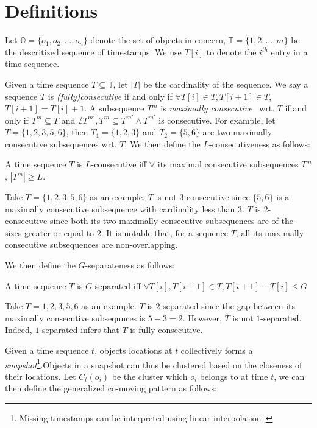 \section{Definitions}
\label{sec:definition}
Let $\mathbb{O} = \{o_1 ,o_2,...,o_n\}$ denote the set of objects in concern, $\mathbb{T} = \{1,2,...,m\}$ be the descritized sequence of timestamps. We use $T[i]$ to denote the $i^{th}$ entry in a time sequence.

Given a time sequence $T \subseteq \mathbb{T}$, let $|T|$ be the cardinality of the sequence. We say a sequence $T$ is \emph{(fully)consecutive}
if and only if $\forall T[i] \in T, T[i+1] \in T$, $T[i+1] = T[i] + 1$. A subsequence $T^m$ is \emph{maximally consecutive}~\cite{li2015platoon} wrt. $T$ if and only if $T^m \subseteq T$ and $\nexists T^{m'}, T^m \subseteq T^{m'} \wedge T^{m'} $ is consecutive. For example, let $T=\{1,2,3,5,6\}$, then $T_1=\{1,2,3\}$ and $T_2=\{5,6\}$ are two maximally consecutive subsequences wrt. $T$. We then define the $L$-consecutiveness as follows:

\begin{definition}[$L$-consecutive]
A time sequence $T$ is $L$-consecutive iff $\forall$ its maximal consecutive subsequences $T^m$, $|T^m| \geq L$.
\end{definition}

Take $T=\{1,2,3,5,6\}$ as an example. $T$ is not $3$-consecutive since $\{5,6\}$ is a maximally consecutive subsequence with cardinality less than $3$. $T$ is $2$-consecutive since both its two maximally consecutive subsequences are of the sizes greater or equal to $2$. It is notable that, for a sequence $T$, all its maximally consecutive subsequences are non-overlapping. 

We then define the $G$-separateness as follows:

\begin{definition}[$G$-separated]
A time sequence $T$ is $G$-separated iff $\forall T[i],T[i+1] \in T, T[i+1]-T[i] \leq G$
\end{definition}

Take $T={1,2,3,5,6}$ as an example. $T$ is $2$-separated since the gap between its maximally consecutive subsequnces is $5-3=2$. However, $T$ is not $1$-separated. Indeed, $1$-separated infers that $T$ is fully consecutive.


Given a time sequence $t$, objects locations at $t$ collectively forms a \emph{snapshot}\footnote{Missing timestamps can be interpreted using linear interpolation~\cite{jeung2008convoy}}.Objects in a snapshot can thus be clustered based on the
closeness of their locations. Let $C_t(o_i)$ be the cluster which $o_i$ belongs to at time $t$, we can then define the generalized co-moving pattern as follows:


